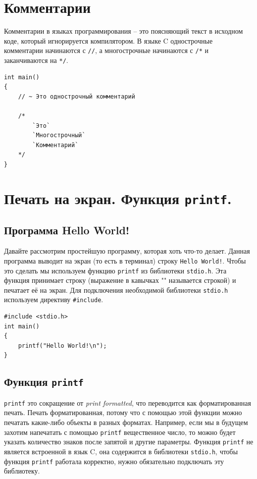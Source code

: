\documentclass{article}
\begin{document}
\section*{Комментарии}
Комментарии в языках программирования -- это поясняющий текст в исходном коде, который игнорируется компилятором. В языке C однострочные комментарии начинаются с \texttt{//}, а многострочные начинаются с \texttt{/*} и заканчиваются на \texttt{*/}.
\begin{lstlisting}
int main() 
{
    // ~ Это однострочный комментарий
    
    /*
    	`Это`
    	`Многострочный`
    	`Комментарий`
    */
}
\end{lstlisting}




\section*{Печать на экран. Функция \texttt{printf}.}
\subsection*{Программа Hello World!}
Давайте рассмотрим простейшую программу, которая хоть что-то делает. Данная программа выводит на экран (то есть в терминал) строку \texttt{Hello World!}. Чтобы это сделать мы используем функцию \texttt{printf} из библиотеки \texttt{stdio.h}. Эта функция принимает строку (выражение в кавычках "{}"{} называется строкой) и печатает её на экран. Для подключения необходимой библиотеки \texttt{stdio.h} используем директиву \texttt{\#include}.
\begin{lstlisting}
#include <stdio.h>
int main() 
{
    printf("Hello World!\n");
}
\end{lstlisting}


\subsection*{Функция \texttt{printf}}
\texttt{printf} это сокращение от \textit{print formatted}, что переводится как форматированная печать.
Печать форматированная, потому что с помощью этой функции можно печатать какие-либо объекты в разных форматах.
Например, если мы в будущем захотим напечатать с помощью \texttt{printf} вещественное число, то можно будет
указать количество знаков после запятой и другие параметры. Функция \texttt{printf} не является встроенной в язык C, она содержится в библиотеки \texttt{stdio.h}, чтобы функция \texttt{printf} работала корректно, нужно обязательно подключать эту библиотеку.
\end{document}
